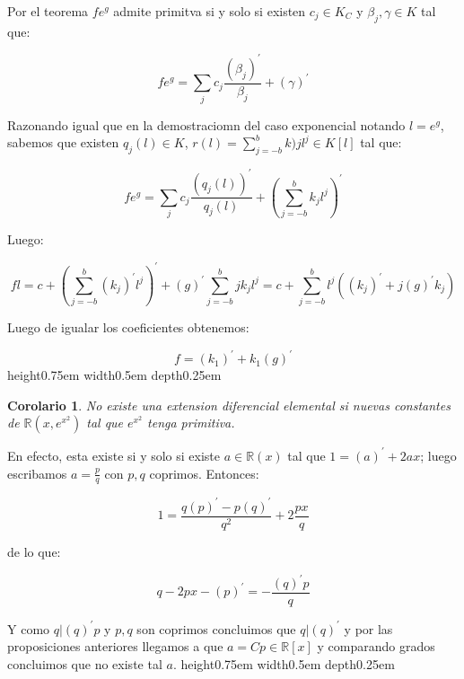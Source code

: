 \documentclass[11pt]{article}
\newcommand{\R}{{\mathbb{R}}}
\newcommand{\derivation}[1]{\left(#1\right)^\prime}
\newcommand{\constants}[1]{#1_C}
\numberwithin{theorem}{subsection}
\newtheorem{corollary}[theorem]{Corolario}
\newenvironment{proof}[1][Demostraci\'on]{\begin{trivlist}
		\item[\hskip \labelsep {\bfseries #1}]}{\end{trivlist}}
\newcommand{\qed}{\nobreak \ifvmode \relax \else
	\ifdim\lastskip<1.5em \hskip-\lastskip
	\hskip1.5em plus0em minus0.5em \fi \nobreak
	\vrule height0.75em width0.5em depth0.25em\fi}
\begin{document}
\begin{proof}
	Por el teorema $fe^g$ admite primitva si y solo si existen $c_j \in \constants{K}$ y $\beta_j, \gamma \in K$ tal que:
	
	\begin{equation}
		fe^g = \sum\limits_j c_j \dfrac{\derivation{\beta_j}}{\beta_j} + \derivation{\gamma}
	\end{equation}
	
	Razonando igual que en la demostraciomn del caso exponencial notando $l = e^g$, sabemos que existen $q_j(l) \in K$, $r(l) = \sum\limits_{j=-b}^{b} {k)j l^j} \in K[l]$ tal que:
	
	\begin{equation}
	fe^g = \sum\limits_j c_j \dfrac{\derivation{q_j(l)}}{q_j(l)} + \derivation{\sum\limits_{j=-b}^{b} {k_j l^j}}
	\end{equation}
	
	Luego:
	
	
	\begin{equation}
	fl = c + \derivation{\sum\limits_{j=-b}^{b} {\derivation{k_j} l^j}} + \derivation{g} \sum\limits_{j=-b}^{b} {j k_j l^{j}} = c +  \sum\limits_{j=-b}^{b} {l^j \left(\derivation{k_j} + j \derivation{g} k_j\right)}
	\end{equation}
	
	Luego de igualar los coeficientes obtenemos:
	
	\begin{equation}
		f = \derivation{k_1} + k_1 \derivation{g}
	\end{equation}
	\qed
\end{proof}

\begin{corollary}
	No existe una extension diferencial elemental si nuevas constantes de $\R(x, e^{x^2})$ tal que $e^{x^2}$ tenga primitiva.
\end{corollary}

\begin{proof}
	En efecto, esta existe si y solo si existe $a \in \R(x)$ tal que $1 = \derivation{a} + 2ax$; luego escribamos $a = \frac{p}{q}$ con $p,q$ coprimos. Entonces:
	
	\begin{equation}
	1 = \dfrac{q\derivation{p} - p \derivation{q}}{q^2} + 2\dfrac{px}{q}
	\end{equation}
	
	de lo que:
	
	\begin{equation}
		q - 2px - \derivation{p} = - \dfrac{\derivation{q}p}{q}
	\end{equation}
	
	Y como $q \vert \derivation{q}p$ y $p,q$ son coprimos concluimos que $q \vert \derivation{q}$ y por las proposiciones anteriores llegamos a que $a = Cp \in \R[x]$ y comparando grados concluimos que no existe tal $a$. \qed
	
\end{proof}
\end{document}
